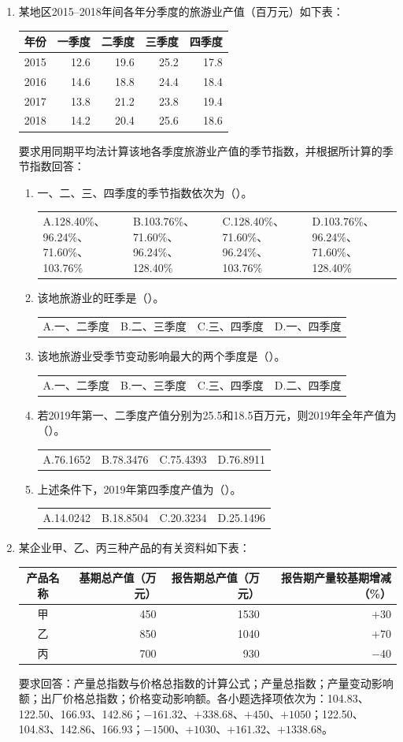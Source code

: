 \documentclass[UTF8,a4paper,10pt]{ctexart}
\makeatletter
\newcommand{\opts}[1]{\par\hspace*{.5em}\begin{tabularx}{\dimexpr\linewidth-.5em}{@{}XXXX@{}}#1\end{tabularx}\par}
\makeatother
\begin{document}
\begin{enumerate}
\item 某地区2015--2018年间各年分季度的旅游业产值（百万元）如下表：
\begin{center}\begin{tabular}{crrrr}\toprule 年份&一季度&二季度&三季度&四季度\\\midrule2015&12.6&19.6&25.2&17.8\\2016&14.6&18.8&24.4&18.4\\2017&13.8&21.2&23.8&19.4\\2018&14.2&20.4&25.6&18.6\\\bottomrule\end{tabular}\end{center}
要求用同期平均法计算该地各季度旅游业产值的季节指数，并根据所计算的季节指数回答：
\begin{enumerate}[label=（\arabic*）,leftmargin=2.8em]\item 一、二、三、四季度的季节指数依次为（）。\opts{A.128.40\%、96.24\%、71.60\%、103.76\%&B.103.76\%、71.60\%、96.24\%、128.40\%&C.128.40\%、71.60\%、96.24\%、103.76\%&D.103.76\%、96.24\%、71.60\%、128.40\%}\item 该地旅游业的旺季是（）。\opts{A.一、二季度&B.二、三季度&C.三、四季度&D.一、四季度}\item 该地旅游业受季节变动影响最大的两个季度是（）。\opts{A.一、二季度&B.一、三季度&C.三、四季度&D.二、四季度}\item 若2019年第一、二季度产值分别为25.5和18.5百万元，则2019年全年产值为（）。\opts{A.76.1652&B.78.3476&C.75.4393&D.76.8911}\item 上述条件下，2019年第四季度产值为（）。\opts{A.14.0242&B.18.8504&C.20.3234&D.25.1496}\end{enumerate}
\item 某企业甲、乙、丙三种产品的有关资料如下表：
\begin{center}\begin{tabular}{crrr}\toprule 产品名称&基期总产值（万元）&报告期总产值（万元）&报告期产量较基期增减（\%）\\\midrule 甲&450&1530&$+30$\\乙&850&1040&$+70$\\丙&700&930&$-40$\\\bottomrule\end{tabular}\end{center}
要求回答：产量总指数与价格总指数的计算公式；产量总指数；产量变动影响额；出厂价格总指数；价格变动影响额。各小题选择项依次为：104.83、122.50、166.93、142.86；$-161.32$、$+338.68$、$+450$、$+1050$；122.50、104.83、142.86、166.93；$-1500$、$+1030$、$+161.32$、$+1338.68$。

\end{enumerate}
\end{document}
